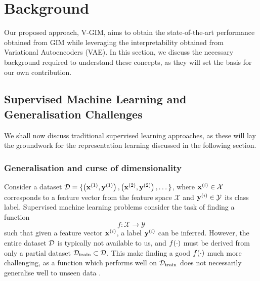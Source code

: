 
\chapter{Background} \label{cha:2}

Our proposed approach, V-GIM, aims to obtain the state-of-the-art performance obtained from GIM while leveraging the interpretability obtained from Variational Autoencoders (VAE). In this section, we discuss the necessary background required to understand these concepts, as they will set the basis for our own contribution.



\section{Supervised Machine Learning and Generalisation Challenges}

	
	
	
	We shall now discuss traditional supervised learning approaches, as these will lay the groundwork for the representation learning discussed in the following section. 
	
	\subsection{Generalisation and curse of dimensionality}
		Consider a dataset $\mathcal{D} = \{ \left( \mathbf{x}^{(1)}, \mathbf{y}^{(1)} \right), \left( \mathbf{x}^{(2)}, \mathbf{y}^{(2)} \right), \dots \}$, where $\mathbf{x}^{(i)} \in \mathcal{X}$ corresponds to a feature vector from the feature space $\mathcal{X}$ and $\mathbf{y}^{(i)} \in \mathcal{Y}$ its class label. Supervised machine learning problems consider the task of finding a function
		$$f: \mathcal{X} \rightarrow \mathcal{Y} \label{eq:fxy} $$
		such that given a feature vector $\mathbf{x}^{(i)}$, a label $\mathbf{y}^{(i)}$ can be inferred. However, the entire dataset $\mathcal{D}$ is typically not available to us, and $f(\cdot)$ must be derived from only a partial dataset $\mathcal{D}_{\text{train}} \subset \mathcal{D}$. This make finding a good $f(\cdot)$ much more challenging, as a function which performs well on $\mathcal{D}_{\text{train}} $ does not necessarily generalise well to unseen data  \citep{neyshaburExploringGeneralizationDeep2017, chungUnknownExamplesMachine2019, barbieroModelingGeneralizationMachine2020}.
	
